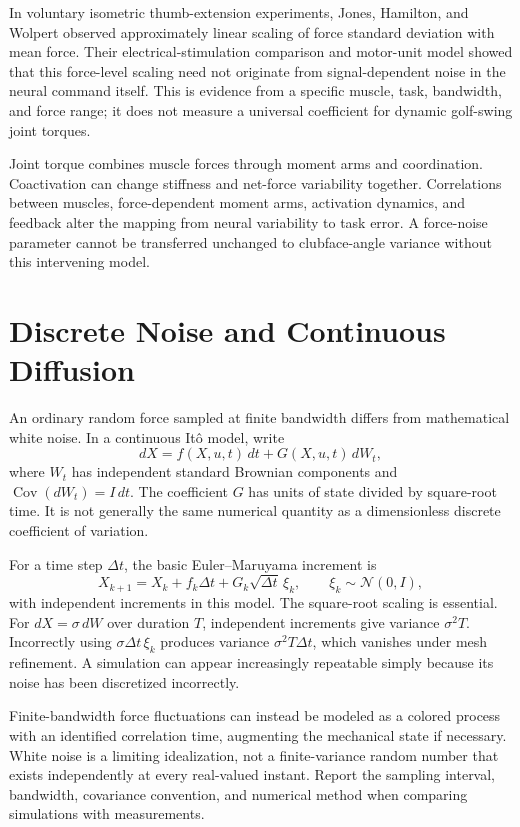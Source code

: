 \documentclass[12pt, openany]{book}
\theoremstyle{plain}
\begin{document}
In voluntary isometric thumb-extension experiments, Jones, Hamilton, and Wolpert observed approximately linear scaling of force standard deviation with mean force. Their electrical-stimulation comparison and motor-unit model showed that this force-level scaling need not originate from signal-dependent noise in the neural command itself. This is evidence from a specific muscle, task, bandwidth, and force range; it does not measure a universal coefficient for dynamic golf-swing joint torques.

Joint torque combines muscle forces through moment arms and coordination. Coactivation can change stiffness and net-force variability together. Correlations between muscles, force-dependent moment arms, activation dynamics, and feedback alter the mapping from neural variability to task error. A force-noise parameter cannot be transferred unchanged to clubface-angle variance without this intervening model.

\section{Discrete Noise and Continuous Diffusion}

An ordinary random force sampled at finite bandwidth differs from mathematical white noise. In a continuous Itô model, write
\begin{equation}
dX=f(X,u,t)\,dt+G(X,u,t)\,dW_t ,
\end{equation}
where $W_t$ has independent standard Brownian components and $\operatorname{Cov}(dW_t)=I\,dt$. The coefficient $G$ has units of state divided by square-root time. It is not generally the same numerical quantity as a dimensionless discrete coefficient of variation.

For a time step $\Delta t$, the basic Euler--Maruyama increment is
\begin{equation}
X_{k+1}=X_k+f_k\Delta t+G_k\sqrt{\Delta t}\,\xi_k,\qquad
\xi_k\sim\mathcal N(0,I),
\end{equation}
with independent increments in this model. The square-root scaling is essential. For $dX=\sigma\,dW$ over duration $T$, independent increments give variance $\sigma^2T$. Incorrectly using $\sigma\Delta t\,\xi_k$ produces variance $\sigma^2T\Delta t$, which vanishes under mesh refinement. A simulation can appear increasingly repeatable simply because its noise has been discretized incorrectly.

Finite-bandwidth force fluctuations can instead be modeled as a colored process with an identified correlation time, augmenting the mechanical state if necessary. White noise is a limiting idealization, not a finite-variance random number that exists independently at every real-valued instant. Report the sampling interval, bandwidth, covariance convention, and numerical method when comparing simulations with measurements.
\end{document}
